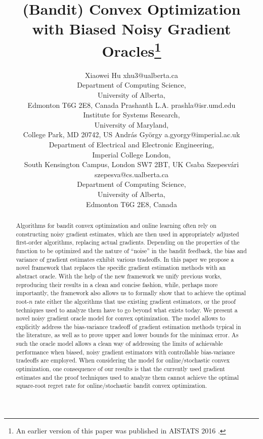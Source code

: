 \documentclass[twoside, 11pt]{article}
\title{(Bandit) Convex Optimization with Biased Noisy Gradient Oracles\thanks{An earlier version of this paper was published in AISTATS 2016 \citep{HuPrGySz16}.}}
\author{\name Xiaowei  Hu \email xhu3@ualberta.ca \\
  \addr Department of Computing Science,\\
  University of Alberta,\\
	Edmonton T6G 2E8, Canada
  \AND
  \name Prashanth L.A. \email prashla@isr.umd.edu\\
  \addr Institute for Systems Research, \\
  University of Maryland, \\
	College Park, MD 20742, US
  \AND
  \name Andr\'as Gy\"orgy \email  a.gyorgy@imperial.ac.uk\\
  \addr Department of Electrical and Electronic Engineering,\\
	Imperial College London,\\
  South Kensington Campus, London SW7 2BT, UK 
  \AND
  \name Csaba Szepesv\'ari \email szepesva@cs.ualberta.ca \\
  \addr Department of Computing Science,\\
  University of Alberta,\\
	Edmonton T6G 2E8, Canada
}
\begin{document}
\maketitle





\begin{abstract}
Algorithms for bandit convex optimization and online learning often 
rely on constructing noisy gradient estimates, which are then used
 in appropriately adjusted first-order algorithms, replacing
 actual gradients.
Depending on the properties of the function to be optimized and the nature of ``noise'' in the bandit feedback,
the bias and variance of gradient estimates exhibit various tradeoffs.
 In this paper we propose a novel framework that replaces the specific gradient estimation
 methods with an abstract oracle.
 With the help of the new framework we unify previous works,
 reproducing  their results in a clean and concise fashion, 
 while, perhaps more importantly, the framework also allows us to formally show that to achieve the optimal 
  root-$n$ rate %
  either the algorithms that use existing gradient estimators,
  or the proof techniques used to analyze them 
  have to go beyond what exists today.
We present a novel noisy gradient oracle model for convex optimization. The model allows to explicitly address the bias-variance tradeoff of gradient estimation methods typical in the literature, as well as to prove upper and lower bounds for the minimax error. As such the oracle model allows a clean way of addressing the limits of achievable performance
when biased, noisy gradient estimators with controllable bias-variance tradeoffs are employed.
When considering the model for online/stochastic convex optimization,
one consequence of our results is that the currently used gradient estimates and the proof techniques used to analyze them cannot 
achieve the optimal square-root regret rate for online/stochastic bandit convex optimization.
\fi
\end{abstract}
\end{document}
